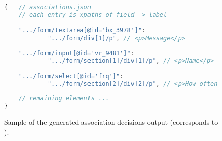 \begin{figure}
    \noindent
	\begin{minipage}[c]{.97\columnwidth}
        \centering
        \begin{lstlisting}[language={JavaScript},frame=ltbr,aboveskip=1.1em,basicstyle={\linespread{0.8}\footnotesize\ttfamily},]		
{	// associations.json
	// each entry is xpaths of field -> label 

	".../form/textarea[@id='bx_3978']": 
			".../form/div[1]/p", // <p>Message</p>
	
	".../form/input[@id='vr_9481']": 
			".../form/section[1]/div[1]/p", // <p>Name</p>
	
	".../form/select[@id='frq']": 
			".../form/section[2]/div[2]/p", // <p>How often ...</p>
	
	// remaining elements ...
}\end{lstlisting}
    \end{minipage} \hfill
\caption{Sample of the generated association decisions output (corresponds to ).}
    \label{fig:label-pairs}
\end{figure}